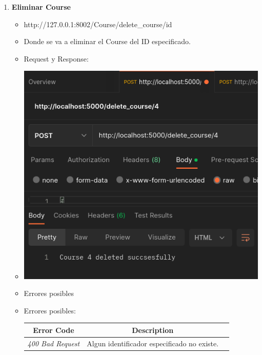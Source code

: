 \documentclass{article}
\begin{document}
\begin{enumerate}
    \item \textbf{Eliminar Course}
    \begin{itemize}
        \item http://127.0.0.1:8002/Course/delete\_course/id
        \item Donde se va a eliminar el Course del ID especificado.
        \item Request y Response:
        \item \includegraphics[scale=.5]{assets/course/delete.png}
        \item Errores posibles
        \item Errores posibles: \begin{table}[H] \centering
        \begin{tabular}{|c|c|l|} \hline \textbf{Error Code} &
        \textbf{Description} \\ \hline \textit{400 Bad Request} & Algun
        identificador especificado no existe. \\ \hline \end{tabular}
        \end{table}
    \end{itemize}

\end{enumerate}


\end{document}
